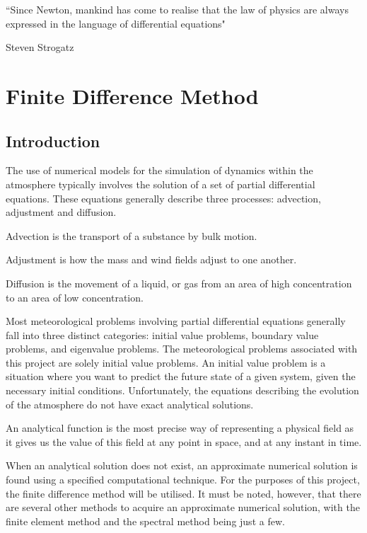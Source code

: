 \epigraph{``Since Newton, mankind has come to realise that the law of physics are always expressed in the language of differential equations"}{Steven Strogatz}

\section{Finite Difference Method}\label{fdm_section}
\subsection{Introduction}
The use of numerical models for the simulation of dynamics within the atmosphere typically involves the solution of a set of partial differential equations. These equations generally describe three processes: advection, adjustment and diffusion. 

\begin{definition}
Advection is the transport of a substance by bulk motion.
\end{definition}

\begin{definition}
Adjustment is how the mass and wind fields adjust to one another.
\end{definition}

\begin{definition}
Diffusion is the movement of a liquid, or gas from an area of high concentration to an area of low concentration.
\end{definition}

Most meteorological problems involving partial differential equations generally fall into three distinct categories: initial value problems, boundary value problems, and eigenvalue problems. The meteorological problems associated with this project are solely initial value problems\cite{numerical_methods}. An initial value problem is a situation where you want to predict the future state of a given system, given the necessary initial conditions. Unfortunately, the equations describing the evolution of the atmosphere do not have exact analytical solutions.

\begin{definition}
An analytical function is the most precise way of representing a  physical field as it gives us the value of this field at any point in space, and at any instant in time.
\end{definition}

When an analytical solution does not exist, an approximate numerical solution is found using a specified computational technique\cite{numerical_methods}. For the purposes of this project, the finite difference method will be utilised. It must be noted, however, that there are several other methods to acquire an approximate numerical solution, with the finite element method and the spectral method being just a few.

